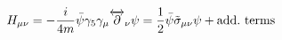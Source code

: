 \begin{equation}
H_{\mu \nu} = -  \frac{i}{4m} \bar{\psi} \gamma_{5} \gamma_{\mu} 
\overleftrightarrow{\partial}_{\nu} \psi = \frac{1}{2} 
\bar{\psi} \tilde{\sigma}_{\mu \nu} \psi + {\rm add.~ terms}     \label{eq:hy}
\end{equation}

